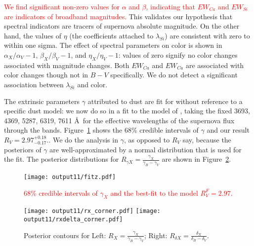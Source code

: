 \documentclass{aastex61}   	%
\begin{document}
\textcolor{red}{
We find significant non-zero values for $\alpha$ and $\beta$, indicating that $EW_{Ca}$ and $EW_{Si}$ are indicators of broadband
magnitudes.}
This validates our hypothesis that spectral indicators
are tracers of supernova absolute magnitude.  On the other hand, the values of $\eta$ (the coefficients attached to $\lambda_{Si}$) are consistent with zero
to  within one sigma.
The effect of spectral parameters on color is shown in $\alpha_X/\alpha_V-1$,  $\beta_X/\beta_V-1$, and  $\eta_X/\eta_V-1$:
values of zero signify no color changes associated with magnitude changes.
Both $EW_{Ca}$ and $EW_{Ca}$ are associated with color changes though not in $B-V$ specifically.
We do not detect a significant association between
$\lambda_{Si}$ and color.


\color{red}

The extrinsic parameters $\gamma$ attributed to dust are fit for without reference to a specific dust model:
we now do so in a fit to the 
model of \citet{1999PASP..111...63F},
taking the fixed 3693,  4369,  5287,  6319, 7611 \AA\  for the effective wavelengths of the supernova flux through the bands.
Figure~\ref{fitz:fig} shows the   68\% credible intervals of $\gamma$ and our result
$R_V=2.97^{+0.18}_{-0.17}$..  
We do the analysis in $\gamma$, as opposed to $R_V$ say, because the posteriors of $\gamma$ are well-approximated by a normal distribution that is used for the fit.
The posterior distributions for $R_{\gamma X}=\frac{\gamma_X}{\gamma_B-\gamma_V}$ are shown in Figure~\ref{rx:fig}.
\color{black}

\begin{figure}[htbp] %
   \centering
   \texttt{[image: output11/fitz.pdf]}
   \caption{\textcolor{red}{68\% credible intervals of $\gamma_X$ and the best-fit to the  \citet{1999PASP..111...63F}  model $R^F_V=2.97$.}
   \label{fitz:fig}}
\end{figure}


\begin{figure}[htbp] %
   \centering
   \texttt{[image: output11/rx\_corner.pdf]}
      \texttt{[image: output11/rxdelta\_corner.pdf]} 
   \caption{Posterior contours for Left:  $R_X=\frac{\gamma_X}{\gamma_B-\gamma_V}$;  Right:  $R_{\delta X}=\frac{\delta_X}{\delta_B-\delta_V}$.
   \label{rx:fig}}
\end{figure}


%
%
%
\end{document}
